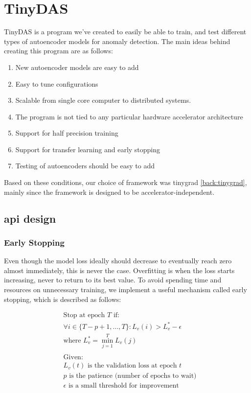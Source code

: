 \section{TinyDAS}

TinyDAS is a program we've created to easily be able to train, and test different types of autoencoder models for anomaly detection. The main ideas behind creating this program are as follows:

\begin{enumerate}
    \item New autoencoder models are easy to add
    \item Easy to tune configurations
    \item Scalable from single core computer to distributed systems.
    \item The program is not tied to any particular hardware accelerator architecture
    \item Support for half precision training
    \item Support for transfer learning and early stopping
    \item Testing of autoencoders should be easy to add
\end{enumerate}

Based on these conditions, our choice of framework was tinygrad \ref{back:tinygrad}, mainly since the framework is designed to be accelerator-independent.

\subsection{\acrshort{api} design}

\subsubsection{Early Stopping}

Even though the model loss ideally should decrease to eventually reach zero almost immediately, this is never the case. Overfitting is when the loss starts increasing, never to return to its best value. To avoid spending time and resources on unnecessary training, we implement a useful mechanism called early stopping, which is described as follows:

\begin{align*}
&\text{Stop at epoch } T \text{ if:} \\
&\forall i \in \{T-p+1, ..., T\}: L_v(i) > L_v^* - \epsilon \\
&\text{where } L_v^* = \min_{j=1}^{T} L_v(j) \\
\\
&\text{Given:} \\
&L_v(t) \text{ is the validation loss at epoch } t \\
&p \text{ is the patience (number of epochs to wait)} \\
&\epsilon \text{ is a small threshold for improvement}
\end{align*}